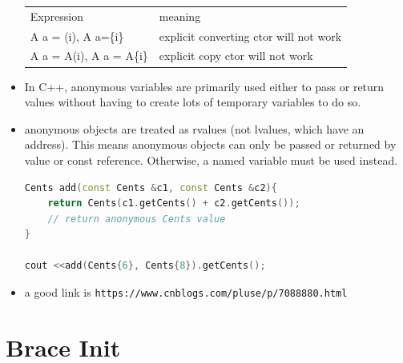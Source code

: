 \documentclass[a4paper,11pt,twoside]{book}
\renewcommand{\hline}{}
\begin{document}
\begin{itemize}
	\begin{tabular}{|p{}|p{}|}
	\hline
	Expression & meaning \\
	\hline
	A a = (i), A a=\{i\} & explicit converting ctor will not work \\
	\hline
	A a = A(i), A a = A\{i\} & explicit copy ctor will not work \\
	\hline
\end{tabular}

\item In C++, anonymous variables are primarily used either to pass or return values without having to create lots of temporary variables to do so.
		
\item anonymous objects are treated as rvalues (not lvalues, which have an address). This means anonymous objects can only be passed or returned by value or const reference. Otherwise, a named variable must be used instead.
		
\begin{lstlisting}[frame=single, language=c++]
Cents add(const Cents &c1, const Cents &c2){
	return Cents(c1.getCents() + c2.getCents());
	// return anonymous Cents value
}
		
cout <<add(Cents{6}, Cents{8}).getCents();
\end{lstlisting}

\item a good link is \verb|https://www.cnblogs.com/pluse/p/7088880.html|


	
\end{itemize}



\section{Brace Init}
\end{document}
